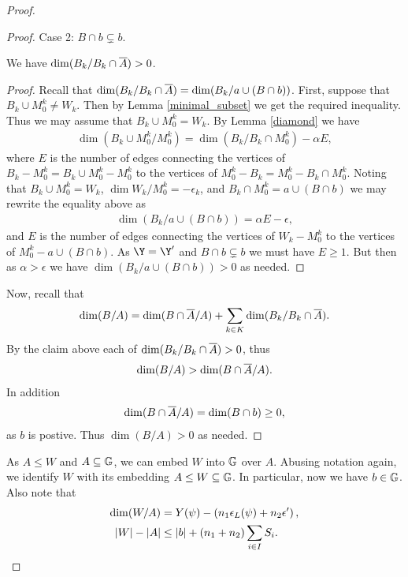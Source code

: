 \documentclass{amsart}
\begin{document}
\begin{proof}
\begin{proof}
    Case 2: $B \cap b \subsetneq b$.
    \begin{Claim} We have $\dim(B_k / B_k \cap \overline{A}) > 0$.
    \end{Claim}
    \begin{proof}
      Recall that $\dim(B_k / B_k \cap \overline{A}) = \dim(B_k / a \cup (B \cap b))$.
      First, suppose that $B_k \cup M_0^k \neq W_k$.
      Then by Lemma \ref{minimal_subset} we get the required inequality.
      Thus we may assume that $B_k \cup M_0^k = W_k$.
      By Lemma \ref{diamond} we have
      \begin{align*}
        \dim(B_k \cup M_0^k / M_0^k) = \dim(B_k / B_k \cap M_0^k) - \alpha E,
      \end{align*}
      where $E$ is the number of edges connecting the vertices of
      $B_k - M_0^k = B_k \cup M_0^k - M_0^k$ to the vertices of $M_0^k - B_k = M_0^k - B_k \cap M_0^k$.
      Noting that $B_k \cup M_0^k = W_k$, $\dim{W_k / M_0^k} = -\epsilon_k$, and $B_k \cap M_0^k = a \cup (B \cap b)$
      we may rewrite the equality above as
      \begin{align*}
        \dim(B_k / a \cup (B \cap b)) = \alpha E - \epsilon,
      \end{align*}
      and $E$ is the number of edges connecting the vertices of $W_k - M_0^k$ to the vertices of $M_0^k - a \cup (B \cap b)$.
      As $\Y = \Y'$ and $B \cap b \subsetneq b$ we must have $E \geq 1$.
      But then as $\alpha > \epsilon$ we have $\dim(B_k / a \cup (B \cap b)) > 0$ as needed.
    \end{proof}
    Now, recall that
    \begin{align*}
      \dim(B/A) = \dim(B \cap \overline{A} / A) + \sum_{k \in K} \dim(B_k/ B_k \cap \overline{A}).
    \end{align*}
    By the claim above each of $\dim(B_k/ B_k \cap \overline{A}) > 0$, thus
    \begin{align*}
      \dim(B/A) > \dim(B \cap \overline{A} / A).
    \end{align*}
    In addition
    \begin{align*}
      \dim(B \cap \overline{A} / A) = \dim (B \cap b) \geq 0,
    \end{align*}
    as $b$ is postive.
    Thus $\dim (B/A) > 0$ as needed.
  \end{proof}

  As $A \leq W$ and $A \subseteq \mathbb G$, we can embed $W$ into $\mathbb G$ over $A$.
  Abusing notation again, we identify $W$ with its embedding $A \leq W \subseteq \mathbb G$.
  In particular, now we have $b \in \mathbb G$.
  Also note that
  \begin{align*}
    \dim(W/A) &= Y(\psi) - \left(n_1 \epsilon_L(\psi) + n_2 \epsilon'\right), \\
    |W| - |A| &\leq |b| + (n_1 + n_2) \sum_{i \in I} S_i.
  \end{align*}


\end{proof}
\end{document}
